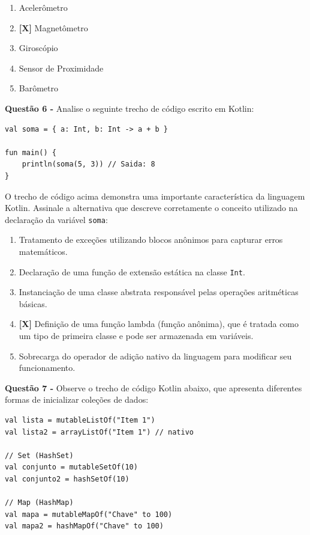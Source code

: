 \documentclass[12pt,a4paper]{article}
\begin{document}
\vspace{0.4cm}

\begin{enumerate}[label=\alph*)]
    \item Acelerômetro
    \item \textbf{[X]} Magnetômetro
    \item Giroscópio
    \item Sensor de Proximidade
    \item Barômetro
\end{enumerate}

\vspace{0.5cm}

\textbf{Questão 6 - } Analise o seguinte trecho de código escrito em Kotlin:

\begin{lstlisting}[basicstyle=\small\ttfamily, breaklines=true]
val soma = { a: Int, b: Int -> a + b }

fun main() {
    println(soma(5, 3)) // Saida: 8
}
\end{lstlisting}

O trecho de código acima demonstra uma importante característica da linguagem Kotlin. Assinale a alternativa que descreve corretamente o conceito utilizado na declaração da variável \texttt{soma}:

\begin{enumerate}[label=\alph*)]
    \item Tratamento de exceções utilizando blocos anônimos para capturar erros matemáticos.
    \item Declaração de uma função de extensão estática na classe \texttt{Int}.
    \item Instanciação de uma classe abstrata responsável pelas operações aritméticas básicas.
    \item \textbf{[X]} Definição de uma função lambda (função anônima), que é tratada como um tipo de primeira classe e pode ser armazenada em variáveis.
    \item Sobrecarga do operador de adição nativo da linguagem para modificar seu funcionamento.
\end{enumerate}

\vspace{0.5cm}

\textbf{Questão 7 - } Observe o trecho de código Kotlin abaixo, que apresenta diferentes formas de inicializar coleções de dados:

\begin{lstlisting}[basicstyle=\small\ttfamily, breaklines=true]
val lista = mutableListOf("Item 1")
val lista2 = arrayListOf("Item 1") // nativo

// Set (HashSet)
val conjunto = mutableSetOf(10)
val conjunto2 = hashSetOf(10)

// Map (HashMap)
val mapa = mutableMapOf("Chave" to 100)
val mapa2 = hashMapOf("Chave" to 100)
\end{lstlisting}
\end{document}

